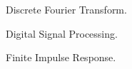 
\item[DFT] Discrete Fourier Transform.
\item[DSP] Digital Signal Processing.
\item[FIR] Finite Impulse Response.

